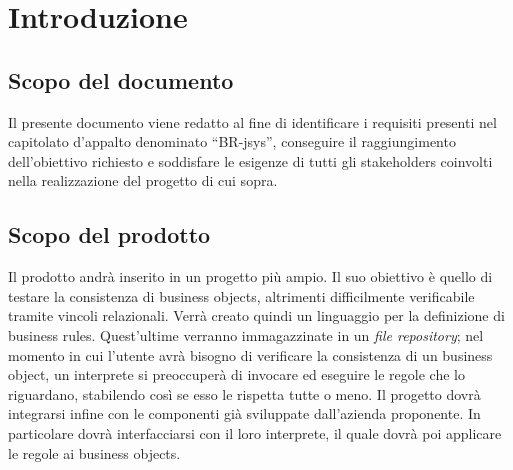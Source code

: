 \tableofcontents

\chapter{Introduzione}
\section{Scopo del documento}
Il presente documento viene redatto al fine di identificare i requisiti presenti nel capitolato d'appalto denominato ``BR-jsys'', conseguire il raggiungimento dell'obiettivo richiesto e soddisfare le esigenze di tutti gli stakeholders coinvolti nella realizzazione del progetto di cui sopra.
\section{Scopo del prodotto}
Il prodotto andr\`a inserito in un progetto pi\`u ampio. Il suo obiettivo \`e quello di testare la consistenza di business objects, altrimenti difficilmente verificabile tramite vincoli relazionali.
Verr\`a creato quindi un linguaggio per la definizione di business rules. Quest'ultime verranno immagazzinate in un \textit{file repository}; nel momento in cui l'utente avr\`a bisogno di verificare la consistenza di un business object, un interprete si preoccuper\`a di invocare ed eseguire le regole che lo riguardano, stabilendo cos\`i se esso le rispetta tutte o meno.
Il progetto dovr\`a integrarsi infine con le componenti gi\`a sviluppate dall'azienda proponente. In particolare dovr\`a interfacciarsi con il loro interprete, il quale dovr\`a poi applicare le regole ai business objects.
